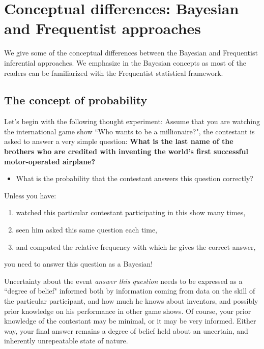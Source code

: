 \chapter{Conceptual differences: Bayesian and Frequentist approaches}\label{chap2}

We give some of the conceptual differences between the Bayesian and Frequentist inferential approaches. We emphasize in the Bayesian concepts as most of the readers can be familiarized with the Frequentist statistical framework.

\section{The concept of probability}\label{sec21}

Let's begin with the following thought experiment: Assume that you are watching the international game show ``Who wants to be a millionaire?", the contestant is asked to answer a very simple question: \textbf{What is the last name of the brothers who are credited with inventing  the world's first successful motor-operated airplane?}

\begin{itemize}
	\item What is the probability that the contestant answers this question correctly? 
\end{itemize}

Unless you have: 

\begin{enumerate}
	\item  watched this particular contestant participating in this show many times,
	\item seen him asked this same question each time, 
	\item and computed the relative frequency with which he gives the correct answer,   
\end{enumerate}
 
you need to answer this question as a Bayesian!

Uncertainty about the event \textit{answer this question} needs to be expressed as a ``degree of belief" informed both by information coming from data on the skill of the particular participant, and how much he knows about inventors, and possibly prior knowledge on his performance in other game shows. Of course, your prior knowledge of the contestant may be minimal, or it may be very informed. Either way, your final answer remains a degree of belief held about an uncertain, and inherently unrepeatable state of nature.


